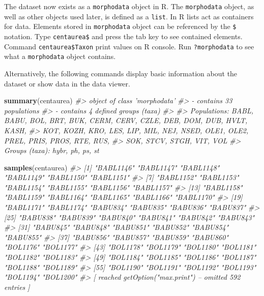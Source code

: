 \documentclass[
]{article}
\newenvironment{Shaded}{\begin{snugshade}}{\end{snugshade}}
\newcommand{\CommentTok}[1]{\textcolor[rgb]{0.56,0.35,0.01}{\textit{#1}}}
\newcommand{\KeywordTok}[1]{\textcolor[rgb]{0.13,0.29,0.53}{\textbf{#1}}}
\newcommand{\NormalTok}[1]{#1}
\begin{document}
The dataset now exists as a \texttt{morphodata} object in R. The
\texttt{morphodata} object, as well as other objects used later, is
defined as a \texttt{list}. In R lists act as containers for data.
Elements stored in \texttt{morphodata} object can be referenced by the
\texttt{\$} notation. Type \texttt{centaurea\$} and press the tab key to
see contained elements. Command \texttt{centaurea\$Taxon} print values
on R console. Run \texttt{?morphodata} to see what a \texttt{morphodata}
object contains.

Alternatively, the following commands display basic information about
the dataset or show data in the data viewer.

\begin{Shaded}
\begin{Highlighting}[]
\KeywordTok{summary}\NormalTok{(centaurea)}
\CommentTok{#> object of class 'morphodata'}
\CommentTok{#> - contains 33 populations}
\CommentTok{#> - contains 4 defined groups (taxa)}
\CommentTok{#> }
\CommentTok{#> Populations: BABL, BABU, BOL, BRT, BUK, CERM, CERV, CZLE, DEB, DOM, DUB, HVLT, KASH,}
\CommentTok{#>  KOT, KOZH, KRO, LES, LIP, MIL, NEJ, NSED, OLE1, OLE2, PREL, PRIS, PROS, RTE, RUS,}
\CommentTok{#>  SOK, STCV, STGH, VIT, VOL}
\CommentTok{#> Groups (taxa): hybr, ph, ps, st}
\end{Highlighting}
\end{Shaded}

\begin{Shaded}
\begin{Highlighting}[]
\KeywordTok{samples}\NormalTok{(centaurea)}
\CommentTok{#>  [1] "BABL1146" "BABL1147" "BABL1148" "BABL1149" "BABL1150" "BABL1151"}
\CommentTok{#>  [7] "BABL1152" "BABL1153" "BABL1154" "BABL1155" "BABL1156" "BABL1157"}
\CommentTok{#> [13] "BABL1158" "BABL1159" "BABL1164" "BABL1165" "BABL1166" "BABL1170"}
\CommentTok{#> [19] "BABL1171" "BABL1174" "BABU834"  "BABU835"  "BABU836"  "BABU837" }
\CommentTok{#> [25] "BABU838"  "BABU839"  "BABU840"  "BABU841"  "BABU842"  "BABU843" }
\CommentTok{#> [31] "BABU845"  "BABU848"  "BABU851"  "BABU852"  "BABU854"  "BABU855" }
\CommentTok{#> [37] "BABU856"  "BABU857"  "BABU859"  "BABU860"  "BOL1176"  "BOL1177" }
\CommentTok{#> [43] "BOL1178"  "BOL1179"  "BOL1180"  "BOL1181"  "BOL1182"  "BOL1183" }
\CommentTok{#> [49] "BOL1184"  "BOL1185"  "BOL1186"  "BOL1187"  "BOL1188"  "BOL1189" }
\CommentTok{#> [55] "BOL1190"  "BOL1191"  "BOL1192"  "BOL1193"  "BOL1194"  "BOL1200" }
\CommentTok{#>  [ reached getOption("max.print") -- omitted 592 entries ]}
\end{Highlighting}
\end{Shaded}
\end{document}

